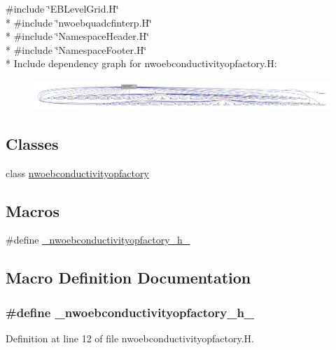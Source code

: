 {\ttfamily \#include \char`\"{}E\+B\+Level\+Grid.\+H\char`\"{}}\\*
{\ttfamily \#include \char`\"{}nwoebquadcfinterp.\+H\char`\"{}}\\*
{\ttfamily \#include \char`\"{}Namespace\+Header.\+H\char`\"{}}\\*
{\ttfamily \#include \char`\"{}Namespace\+Footer.\+H\char`\"{}}\\*
Include dependency graph for nwoebconductivityopfactory.\+H\+:\nopagebreak
\begin{figure}[H]
\begin{center}
\leavevmode
\includegraphics[width=350pt]{nwoebconductivityopfactory_8H__incl}
\end{center}
\end{figure}
\subsection*{Classes}
\begin{DoxyCompactItemize}
\item 
class \hyperlink{classnwoebconductivityopfactory}{nwoebconductivityopfactory}
\end{DoxyCompactItemize}
\subsection*{Macros}
\begin{DoxyCompactItemize}
\item 
\#define \hyperlink{nwoebconductivityopfactory_8H_a611a122cb9d296049ddc0196a0dc85db}{\+\_\+nwoebconductivityopfactory\+\_\+h\+\_\+}
\end{DoxyCompactItemize}


\subsection{Macro Definition Documentation}
\subsubsection[{\texorpdfstring{\+\_\+nwoebconductivityopfactory\+\_\+h\+\_\+}{_nwoebconductivityopfactory_h_}}]{\setlength{\rightskip}{0pt plus 5cm}\#define \+\_\+nwoebconductivityopfactory\+\_\+h\+\_\+}\hypertarget{nwoebconductivityopfactory_8H_a611a122cb9d296049ddc0196a0dc85db}{}\label{nwoebconductivityopfactory_8H_a611a122cb9d296049ddc0196a0dc85db}


Definition at line 12 of file nwoebconductivityopfactory.\+H.

